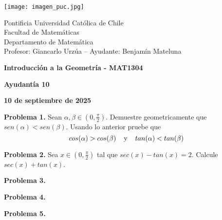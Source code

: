 \documentclass{article}
\begin{document}
\begin{minipage}{2.5cm}
    \texttt{[image: imagen\_puc.jpg]}
\end{minipage}
\begin{minipage}{14cm}
    {\sc Pontificia Universidad Católica de Chile\\
    Facultad de Matemáticas\\
    Departamento de Matemática\\
    Profesor: Giancarlo Urzúa -- Ayudante: Benjamín Mateluna}
\end{minipage}
\vspace{1ex}

{\centerline{\bf Introducción a la Geometría - MAT1304}
\centerline{\bf Ayudantía 10}}
\centerline{\bf 10 de septiembre de 2025}

\vspace{1cm}
\noindent\textbf{Problema 1.} Sean $\alpha,\beta\in(0,\frac{\pi}{2})$. Demuestre geometricamente
que $sen(\alpha)<sen(\beta)$. Usando lo anterior pruebe que
\begin{equation*}
    cos(\alpha)>cos(\beta)\hspace{4mm}\text{y}\hspace{4mm}tan(\alpha)<tan(\beta)
\end{equation*}

\vspace{5mm}
\noindent\textbf{Problema 2.} Sea $x\in(0,\frac{\pi}{2})$ tal que $sec(x)-tan(x)=2$. Calcule
$sec(x)+tan(x)$.

\vspace{5mm}
\noindent\textbf{Problema 3.}

\vspace{5mm}
\noindent\textbf{Problema 4.}

\vspace{5mm}
\noindent\textbf{Problema 5.}

\end{document}
